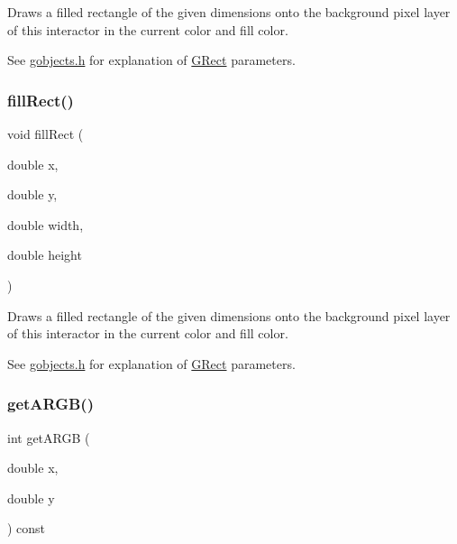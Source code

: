 Draws a filled rectangle of the given dimensions onto the background pixel layer of this interactor in the current color and fill color. 

See \mbox{\hyperlink{gobjects_8h_source}{gobjects.\+h}} for explanation of \mbox{\hyperlink{classGRect}{G\+Rect}} parameters. \mbox{\label{classGDrawingSurface_aac3ae7d3aee950de78eca0e108352254}} 
\subsubsection{\texorpdfstring{fill\+Rect()}{fillRect()}\hspace{0.1cm}{\footnotesize\ttfamily [2/2]}}
{\footnotesize\ttfamily void fill\+Rect (\begin{DoxyParamCaption}\item[{double}]{x,  }\item[{double}]{y,  }\item[{double}]{width,  }\item[{double}]{height }\end{DoxyParamCaption})\hspace{0.3cm}{\ttfamily [virtual]}}



Draws a filled rectangle of the given dimensions onto the background pixel layer of this interactor in the current color and fill color. 

See \mbox{\hyperlink{gobjects_8h_source}{gobjects.\+h}} for explanation of \mbox{\hyperlink{classGRect}{G\+Rect}} parameters. \mbox{\label{classGDrawingSurface_ae394d39f20476570e083918d991c25bd}} 
\subsubsection{\texorpdfstring{get\+A\+R\+G\+B()}{getARGB()}}
{\footnotesize\ttfamily int get\+A\+R\+GB (\begin{DoxyParamCaption}\item[{double}]{x,  }\item[{double}]{y }\end{DoxyParamCaption}) const\hspace{0.3cm}{\ttfamily [virtual]}}



